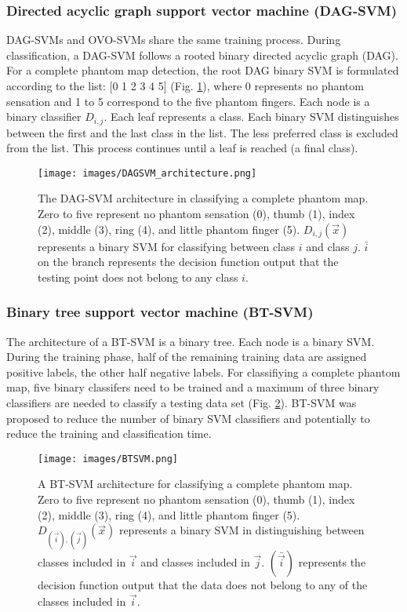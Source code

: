 \subsubsection{Directed acyclic graph support vector machine (DAG-SVM)}
DAG-SVMs and OVO-SVMs share the same training process. During classification, a DAG-SVM follows a rooted binary directed acyclic graph (DAG). For a complete phantom map detection, the root DAG binary SVM is formulated according to the list: [0 1 2 3 4 5] (Fig. \ref{Fig:DAGSVM_architecture}), where 0 represents no phantom sensation and 1 to 5 correspond to the five phantom fingers. Each node is a binary classifier $D_{i,j}$. Each leaf represents a class. Each binary SVM distinguishes between the first and the last class in the list. The less preferred class is excluded from the list. This process continues until a leaf is reached (a final class). 
\begin{figure}[htb]
    \centering
    \texttt{[image: images/DAGSVM\_architecture.png]}
	\caption{The DAG-SVM architecture in classifying a complete phantom map. Zero to five represent no phantom sensation (0), thumb (1), index (2), middle (3), ring (4), and little phantom finger (5).  $D_{i,j}(\vec{x})$ represents a binary SVM for classifying between class $i$ and class $j$. $\bar{i}$ on the branch represents the decision function output that the testing point does not belong to any class $i$.}
    \label{Fig:DAGSVM_architecture}
\end{figure}

\subsubsection{Binary tree support vector machine (BT-SVM)}
The architecture of a BT-SVM is a binary tree. Each node is a binary SVM. During the training phase, half of the remaining training data are assigned positive labels, the other half negative labels. For classifiying a complete phantom map, five binary classifers need to be trained and a maximum of three binary classifiers are needed to classify a testing data set (Fig.  \ref{Fig:BT_architecture}). BT-SVM was proposed to reduce the number of binary SVM classifiers and potentially to reduce the training and classification time. 
\begin{figure}[htb]
    \centering
    \texttt{[image: images/BTSVM.png]}
    \caption{A BT-SVM architecture for classifying a complete phantom map. Zero to five represent no phantom sensation (0), thumb (1), index (2), middle (3), ring (4), and little phantom finger (5). $D_{(\vec{i}),(\vec{j})}(\vec{x})$ represents a binary SVM in distinguishing between classes included in $\vec{i}$ and classes included in $\vec{j}$. $(\bar{\vec{i}})$ represents the decision function output that the data does not belong to any of the classes included in $\vec{i}$.}
    \label{Fig:BT_architecture}
\end{figure}


